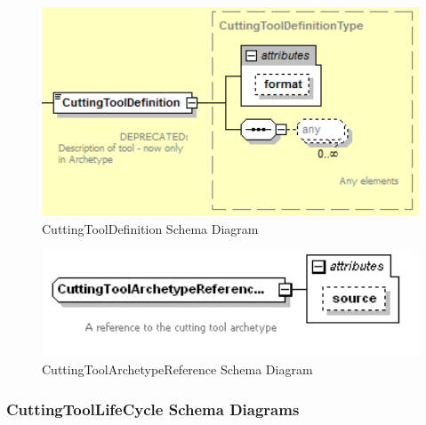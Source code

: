 \FloatBarrier


\begin{figure}[ht]
  \centering
    \includegraphics[width=1.0\textwidth]{figures/CuttingToolDefinition Schema.png}
  \caption{CuttingToolDefinition Schema Diagram}
  \label{fig:CuttingToolDefinition Schema Diagram}
\end{figure}

\FloatBarrier


\begin{figure}[ht]
  \centering
    \includegraphics[width=1.0\textwidth]{figures/CuttingToolArchetypeReference Schema.png}
  \caption{CuttingToolArchetypeReference Schema Diagram}
  \label{fig:CuttingToolArchetypeReference Schema Diagram}
\end{figure}

\FloatBarrier


\subsubsection{CuttingToolLifeCycle Schema Diagrams}
\label{sec:CuttingToolLifeCycle Schema Diagrams}

